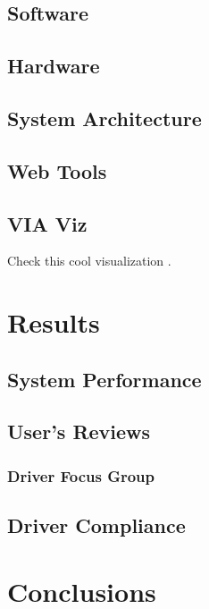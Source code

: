 \documentclass[11pt,letterpaper,]{report}
\begin{document}
\section{Software}

\section{Hardware}

\section{System Architecture}

\section{Web Tools}

\section{VIA Viz}

Check this cool visualization \cite{argote2013}.


\chapter{Results}

\section{System Performance}

\section{User's Reviews}

\subsection{Driver Focus Group}

\section{Driver Compliance}

\chapter{Conclusions}



\end{document}
